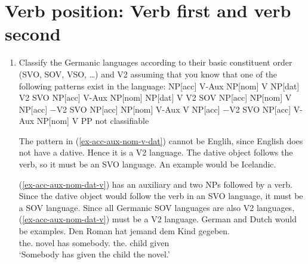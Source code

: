 \section{Verb position: Verb first and verb second}



\begin{enumerate}
\item Classify the Germanic languages according to their basic constituent order (SVO, SOV, VSO,
  \ldots) and V2 assuming that you know that one of the following patterns exist in the language:
\eal
\label{ex-v2-task-solution}
\ex 
\label{ex-acc-aux-nom-v-dat}
NP[acc] V-Aux NP[nom] V NP[dat]   \hfill  V2 SVO 
\ex
\label{ex-acc-aux-nom-dat-v} 
NP[acc] V-Aux NP[nom] NP[dat] V   \hfill  V2 SOV
\ex 
\label{ex-acc-nom-v-acc}
NP[acc] NP[nom] V NP[acc]         \hfill $-$V2 SVO
\ex 
\label{ex-acc-nom-aux-v-acc}
NP[acc] NP[nom] V-Aux V NP[acc]   \hfill $-$V2 SVO
\ex 
\label{ex-acc-aux-nom-v-pp}
NP[acc] V-Aux NP[nom] V PP        \hfill not classifiable
\zl

The pattern in (\ref{ex-acc-aux-nom-v-dat}) cannot be Englih, since English does not have a dative. Hence it is a V2
language. The dative object follows the verb, so it must be an SVO language. An example would be Icelandic.
\ea

\z

(\ref{ex-acc-aux-nom-dat-v}) has an auxiliary and two NPs followed by a verb. Since the dative object would follow the verb
in an SVO language, it must be a SOV language. Since all Germanic SOV languages are also V2
languages, (\ref{ex-acc-aux-nom-dat-v}) must be a V2 language. German and Dutch would be examples.
\ea
\gll Den Roman hat jemand dem Kind gegeben.\\
     the.\ACC{} novel has somebody.\NOM{} the.\DAT{} child given\\
\glt `Somebody has given the child the novel.'
\z


\end{enumerate}
